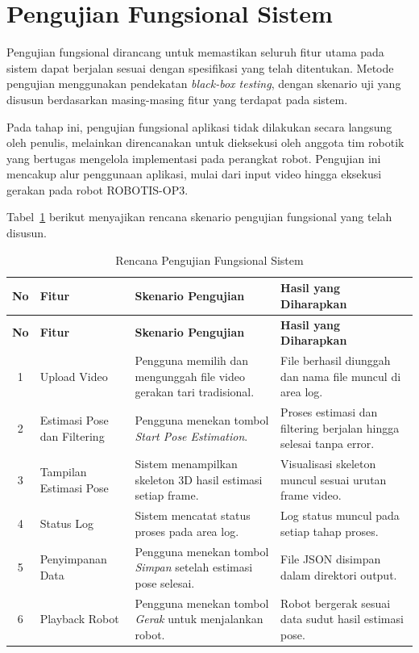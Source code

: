 \section{Pengujian Fungsional Sistem}

Pengujian fungsional dirancang untuk memastikan seluruh fitur utama pada sistem dapat berjalan sesuai dengan spesifikasi yang telah ditentukan. Metode pengujian menggunakan pendekatan \textit{black-box testing}, dengan skenario uji yang disusun berdasarkan masing-masing fitur yang terdapat pada sistem.

Pada tahap ini, pengujian fungsional aplikasi tidak dilakukan secara langsung oleh penulis, melainkan direncanakan untuk dieksekusi oleh anggota tim robotik yang bertugas mengelola implementasi pada perangkat robot. Pengujian ini mencakup alur penggunaan aplikasi, mulai dari input video hingga eksekusi gerakan pada robot ROBOTIS-OP3.

Tabel~\ref{tab:rencana_pengujian_fungsional} berikut menyajikan {rencana skenario pengujian fungsional} yang telah disusun.

\begin{longtable}{|c|p{2.5cm}|p{5cm}|p{4cm}|}
\caption{Rencana Pengujian Fungsional Sistem}
\label{tab:rencana_pengujian_fungsional} \\ \hline
\textbf{No} & \textbf{Fitur} & \textbf{Skenario Pengujian} & \textbf{Hasil yang Diharapkan} \\ \hline
\endfirsthead
\hline
\textbf{No} & \textbf{Fitur} & \textbf{Skenario Pengujian} & \textbf{Hasil yang Diharapkan} \\ \hline
\endhead

1 & Upload Video & Pengguna memilih dan mengunggah file video gerakan tari tradisional. & File berhasil diunggah dan nama file muncul di area log. \\ \hline
2 & Estimasi Pose dan Filtering & Pengguna menekan tombol \textit{Start Pose Estimation}. & Proses estimasi dan filtering berjalan hingga selesai tanpa error. \\ \hline
3 & Tampilan Estimasi Pose & Sistem menampilkan skeleton 3D hasil estimasi setiap frame. & Visualisasi skeleton muncul sesuai urutan frame video. \\ \hline
4 & Status Log & Sistem mencatat status proses pada area log. & Log status muncul pada setiap tahap proses. \\ \hline
5 & Penyimpanan Data & Pengguna menekan tombol \textit{Simpan} setelah estimasi pose selesai. & File JSON disimpan dalam direktori output. \\ \hline
6 & Playback Robot & Pengguna menekan tombol \textit{Gerak} untuk menjalankan robot. & Robot bergerak sesuai data sudut hasil estimasi pose. \\ \hline

\end{longtable}
